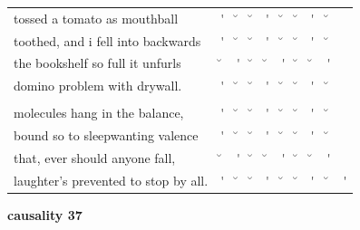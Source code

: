 \documentclass[12pt, landscape]{article}
\begin{document}
\begin{center}
\begin{tabularx}{\textwidth}{
>{\lefting\arraybackslash}X
c
c
c
c
c
c
c
c
c
}

tossed a tomato as mouthball & \'{} & \u{} & \u{} & \'{} & \u{} & \u{} & \'{} & \u{} & \\
toothed, and i fell into backwards & \'{} & \u{} & \u{} & \'{} & \u{} & \u{} & \'{} & \u{} & \\
the bookshelf so full it unfurls & \u{} & \'{} & \u{} & \u{} & \'{} & \u{} & \u{} & \'{} & \\
domino problem with drywall. & \'{} & \u{} & \u{} & \'{} & \u{} & \u{} & \'{} & \u{} & \\
 & & & & & & & & \\
molecules hang in the balance,  & \'{} & \u{} & \u{} & \'{} & \u{} & \u{} & \'{} & \u{} & \\
bound so to sleepwanting valence & \'{} & \u{} & \u{} & \'{} & \u{} & \u{} & \'{} & \u{} & \\
that, ever should anyone fall, & \u{} & \'{} & \u{} & \u{} & \'{} & \u{} & \u{} & \'{} & \\
laughter's prevented to stop by all. & \'{} & \u{} & \u{} & \'{} & \u{} & \u{} & \'{} & \u{} & \'{} \\
\end{tabularx}
\end{center}

\vspace*{\fill}

\newpage

\vspace*{\fill}

\noindent \textbf{causality 37}
\noindent \hfill \par
\end{document}
